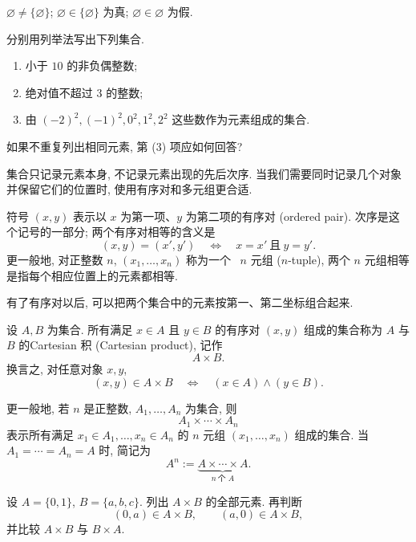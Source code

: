 \documentclass[usesamecnt, thmcnt=section, lang=cn, newtx, 10pt, scheme=chinese]{elegantbook}
\begin{document}
\begin{solution}
$\varnothing\neq\{\varnothing\}$; $\varnothing\in\{\varnothing\}$ 为真; $\varnothing\in\varnothing$ 为假.
\end{solution}

\begin{exercise}\label{ex:sets-roster-01}
分别用列举法写出下列集合.
\begin{enumerate}[label=\rm(\arabic*)]
  \item 小于 $10$ 的非负偶整数;
  \item 绝对值不超过 $3$ 的整数;
  \item 由 $(-2)^2,(-1)^2,0^2,1^2,2^2$ 这些数作为元素组成的集合.
\end{enumerate}
如果不重复列出相同元素, 第 (3) 项应如何回答?
\end{exercise}

集合只记录元素本身, 不记录元素出现的先后次序. 当我们需要同时记录几个对象并保留它们的位置时, 使用有序对和多元组更合适.

\begin{notation}[有序对与元组]\label{not:sets-tuples}
符号 $(x,y)$ 表示以 $x$ 为第一项、$y$ 为第二项的{\color{blue}有序对 (ordered pair)}. 次序是这个记号的一部分; 两个有序对相等的含义是
\[
 (x,y)=(x',y')
 \quad\Leftrightarrow\quad
 x=x'\ \text{且}\ y=y'.
\]
更一般地, 对正整数 $n$, $(x_1,\ldots,x_n)$ 称为一个~ {\color{blue}$n$ 元组 ($n$-tuple)}, 两个 $n$ 元组相等是指每个相应位置上的元素都相等.
\end{notation}

有了有序对以后, 可以把两个集合中的元素按第一、第二坐标组合起来.

\begin{definition}[Cartesian 积]\label{def:sets-cartesian-product}
设 $A,B$ 为集合. 所有满足 $x\in A$ 且 $y\in B$ 的有序对 $(x,y)$ 组成的集合称为 $A$ 与 $B$ 的{\color{blue}Cartesian 积 (Cartesian product)}, 记作
\[
 A\times B.
\]
换言之, 对任意对象 $x,y$,
\[
 (x,y)\in A\times B
 \quad\Leftrightarrow\quad
 (x\in A)\wedge(y\in B).
\]

更一般地, 若 $n$ 是正整数, $A_1,\ldots,A_n$ 为集合, 则
\[
 A_1\times\cdots\times A_n
\]
表示所有满足 $x_1\in A_1,\ldots,x_n\in A_n$ 的 $n$ 元组 $(x_1,\ldots,x_n)$ 组成的集合. 当 $A_1=\cdots=A_n=A$ 时, 简记为
\[
 A^n:=\underbrace{A\times\cdots\times A}_{n\ \text{个~$A$}}.
\]
\end{definition}

\begin{concept}\label{con:sets-02}
设 $A=\{0,1\}$, $B=\{a,b,c\}$. 列出 $A\times B$ 的全部元素. 再判断
\[
 (0,a)\in A\times B,\qquad (a,0)\in A\times B,
\]
并比较 $A\times B$ 与 $B\times A$.
\end{concept}
\end{document}
